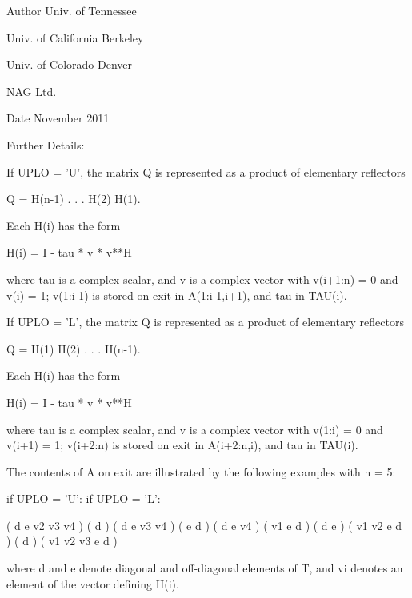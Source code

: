\begin{DoxyAuthor}{Author}
Univ. of Tennessee 

Univ. of California Berkeley 

Univ. of Colorado Denver 

N\+A\+G Ltd. 
\end{DoxyAuthor}
\begin{DoxyDate}{Date}
November 2011 
\end{DoxyDate}
\begin{DoxyParagraph}{Further Details\+: }
\begin{DoxyVerb}  If UPLO = 'U', the matrix Q is represented as a product of elementary
  reflectors

     Q = H(n-1) . . . H(2) H(1).

  Each H(i) has the form

     H(i) = I - tau * v * v**H

  where tau is a complex scalar, and v is a complex vector with
  v(i+1:n) = 0 and v(i) = 1; v(1:i-1) is stored on exit in
  A(1:i-1,i+1), and tau in TAU(i).

  If UPLO = 'L', the matrix Q is represented as a product of elementary
  reflectors

     Q = H(1) H(2) . . . H(n-1).

  Each H(i) has the form

     H(i) = I - tau * v * v**H

  where tau is a complex scalar, and v is a complex vector with
  v(1:i) = 0 and v(i+1) = 1; v(i+2:n) is stored on exit in A(i+2:n,i),
  and tau in TAU(i).

  The contents of A on exit are illustrated by the following examples
  with n = 5:

  if UPLO = 'U':                       if UPLO = 'L':

    (  d   e   v2  v3  v4 )              (  d                  )
    (      d   e   v3  v4 )              (  e   d              )
    (          d   e   v4 )              (  v1  e   d          )
    (              d   e  )              (  v1  v2  e   d      )
    (                  d  )              (  v1  v2  v3  e   d  )

  where d and e denote diagonal and off-diagonal elements of T, and vi
  denotes an element of the vector defining H(i).\end{DoxyVerb}
 
\end{DoxyParagraph}
